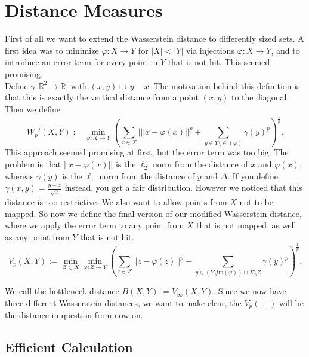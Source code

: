 \documentclass[11pt, a4paper,draft]{report}
\newcommand{\bR}{\mathbb{R}}
\newcommand{\im}{\textrm{im}}
\begin{document}
    \chapter{Distance Measures}\label{ch:distance-measures}

    First of all we want to extend the Wasserstein distance to differently sized sets.
    A first idea was to minimize $\varphi:X\rightarrow Y$ for $|X|<|Y|$ via injections $\varphi:X\rightarrow Y$, and to introduce an error term for every point in $Y$ that is not hit.
    This seemed promising.\\
    Define $\gamma:\bR^2\rightarrow\bR$, with $(x,y)\mapsto y-x$.
    The motivation behind this definition is that this is exactly the vertical distance from a point $(x,y)$ to the diagonal.
    Then we define \[W_p'(X,Y):=\min_{\varphi:X\rightarrow Y}\left(\sum_{x\in X}|||x-\varphi(x)||^p + \sum_{y\in Y\setminus \in(\varphi)}\gamma(y)^p\right)^\frac{1}{p}.\]
    This approach seemed promising at first, but the error term was too big.
    The problem is that $||x-\varphi(x)||$ is the $\ell_2$ norm from the distance of $x$ and $\varphi(x)$, whereas $\gamma(y)$ is the $\ell_1$ norm from the distance of $y$ and $\Delta$.
    If you define $\gamma(x,y)=\frac{y-x}{\sqrt{2}}$ instead, you get a fair distribution.
    However we noticed that this distance is too restrictive.
    We also want to allow points from $X$ not to be mapped.
    So now we define the final version of our modified Wasserstein distance, where we apply the error term to any point from $X$ that is not mapped, as well as any point from $Y$ that is not hit.
    \[V_p(X,Y):=\min_{Z\subset{X}}\min_{\varphi:Z\rightarrow Y}\left(\sum_{z\in Z}||z-\varphi(z)||^p + \sum_{y\in (Y\setminus \im(\varphi))\cup X\setminus Z}\gamma(y)^p\right)^\frac{1}{p}.\]

    We call the bottleneck distance $B(X,Y) := V_\infty(X,Y)$.
    Since we now have three different Wasserstein distances, we want to make clear, the $V_p(\_,\_)$ will be the distance in question from now on.

    \section{Efficient Calculation}\label{sec:efficient-calculation}
\end{document}
